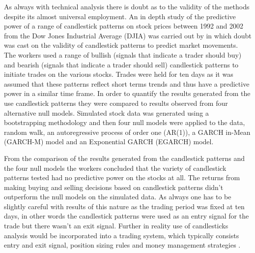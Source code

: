 As always with technical analysis there is doubt as to the validity of the methods despite its almost universal employment. An in depth study of the predictive power of a range of candlestick patterns on stock prices between 1992 and 2002 from the Dow Jones Industrial Average (DJIA) was carried out by \citep{Marshall20062303} in which doubt was cast on the validity of candlestick patterns to predict market movements. The workers used a range of bullish (signals that indicate a trader should buy) and bearish (signals that indicate a trader should sell) candlestick patterns to initiate trades on the various stocks. Trades were held for ten days as it was assumed that these patterns reflect short terms trends and thus have a predictive power in a similar time frame. In order to quantify the results generated from the use candlestick patterns they were compared to results observed from four alternative null models. Simulated stock data was generated using a bootstrapping methodology \citep{EfronBootstrapping} and then four null models were applied to the data, random walk, an autoregressive process of order one (AR(1)), a GARCH in-Mean (GARCH-M) model and an Exponential GARCH (EGARCH) model.

From the comparison of the results generated from the candlestick patterns and the four null models the workers concluded that the variety of candlestick patterns tested had no predictive power on the stocks at all. The returns from making buying and selling decisions based on candlestick patterns didn't outperform the null models on the simulated data. As always one has to be slightly careful with results of this nature as the trading period was fixed at ten days, in other words the candlestick patterns were used as an entry signal for the trade but there wasn't an exit signal. Further in reality use of candlesticks analysis would be incorporated into a trading system, which typically consists entry and exit signal, position sizing rules and money management strategies \citep{faith2007way}.

